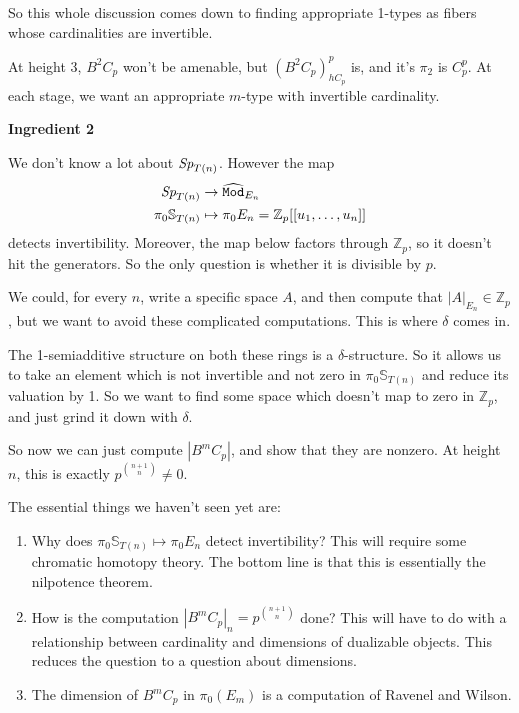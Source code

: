 So this whole discussion comes down to finding appropriate 1-types as fibers whose cardinalities are invertible.

At height 3, $B^2C_p$ won't be amenable, but $\left( B^2 C_p \right)^p_{hC_p}$ is, and it's $\pi_2$ is $C_p^p$. At each stage, we want an appropriate $m$-type with invertible cardinality.

\begin{center}
    \textbf{Ingredient 2}
\end{center}


We don't know a lot about $\textit{Sp}_{T(n)}$. However the map
\begin{align*}
    \textit{Sp}_{T(n)} &\to \widehat{\texttt{Mod}}_{E_n} \\
    \pi_0 \mathbb{S}_{T(n)} &\mapsto \pi_0 E_n = \mathbb{Z}_p[[u_1, \ldots, u_n]]
\end{align*}
detects invertibility. Moreover, the map below factors through $\mathbb{Z}_p$, so it doesn't hit the generators. So the only question is whether it is divisible by $p$.

We could, for every $n$, write a specific space $A$, and then compute that $|A|_{E_n} \in \mathbb{Z}_p$, but we want to avoid these complicated computations. This is where $\delta$ comes in.

The 1-semiadditive structure on both these rings is a $\delta$-structure. So it allows us to take an element which is not invertible and not zero in $\pi_0 \mathbb{S}_{T(n)}$ and reduce its valuation by 1. So we want to find some space which doesn't map to zero in $\mathbb{Z}_p$, and just grind it down with $\delta$.

So now we can just compute $\left| B^m C_p \right|$, and show that they are nonzero. At height $n$, this is exactly $p^{\binom{n+1}{n}} \ne 0$.

The essential things we haven't seen yet are:
\begin{enumerate}
    \item Why does $\pi_0 \mathbb{S}_{T(n)} \mapsto \pi_0 E_n$ detect invertibility? This will require some chromatic homotopy theory. The bottom line is that this is essentially the nilpotence theorem.
    \item How is the computation $\left| B^m C_p \right|_n = p^{\binom{n+1}{n}}$ done? This will have to do with a relationship between cardinality and dimensions of dualizable objects. This reduces the question to a question about dimensions.
    \item The dimension of $B^m C_p$ in $\pi_0 (E_m)$ is a computation of Ravenel and Wilson.
\end{enumerate}

